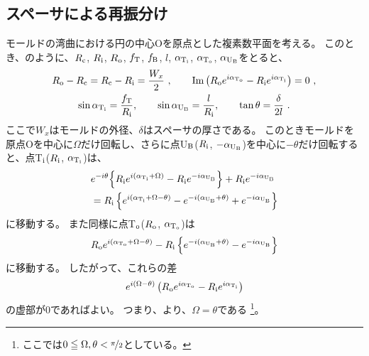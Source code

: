 \subsection{スペーサによる再振分け}
モールドの湾曲における円の中心Oを原点とした複素数平面を考える。
このとき、のように、$R_\text c$, $R_\text i$, $R_\text o$, $f_\text T$, $f_\text B$, $l$, $\alpha_{\text T_\text i}$, $\alpha_{\text T_\text o}$, $\alpha_{\text U_\text B}$をとると、
\begin{subequations}
\label{eq:constraintUpoint}
\begin{gather}
  \label{eq:constraintUpoint1}
  R_\text o - R_\text c = R_\text c - R_\text i = \frac{W_x}2~, \qquad
  \text{Im}\left(R_\text oe^{i\alpha_{\text T_\text o}} - R_\text ie^{i\alpha_{\text T_\text i}}\right) = 0~,\\
  \label{eq:constraintUpoint2}
  \sin\alpha_{\text T_\text i} = \frac{f_\text T}{R_\text i}, \qquad
  \sin\alpha_{\text U_\text B} = \frac l{R_\text i}, \qquad
  \tan\theta = \frac\delta{2l}~.
\end{gather}
\end{subequations}
ここで$W_x$はモールドの外径、$\delta$はスペーサの厚さである。
このときモールドを原点Oを中心に$\Omega$だけ回転し、さらに点U$_\text B$($R_\text i$, $-\alpha_{\text U_\text B}$)を中心に$-\theta$だけ回転すると、点T$_\text i$($R_\text i$, $\alpha_{\text T_\text i}$)は、
\begin{align}
  \notag
  & e^{-i\theta}\!\left\{R_\text ie^{i(\alpha_{\text T_\text i} + \Omega)} - R_\text ie^{-i\alpha_{\text U_\text B}}\right\}
    +R_\text ie^{-i\alpha_{\text U_\text B}}\\
  &= R_\text i
     \left\{
       e^{i(\alpha_{\text T_\text i} + \Omega - \theta)} - e^{-i(\alpha_{\text U_\text B} + \theta)} + e^{-i\alpha_{\text U_\text B}}
     \right\}
  \label{eq:afterftUpoint}
\end{align}
に移動する。
また同様に点T$_\text o$($R_\text o$, $\alpha_{\text T_\text o}$)は
\begin{equation}
  \notag
  R_\text oe^{i(\alpha_{\text T_\text o} + \Omega - \theta)} - R_\text i\left\{e^{-i(\alpha_{\text U_\text B} + \theta)} - e^{-i\alpha_{\text U_\text B}}\right\}
\end{equation}
に移動する。
したがって、これらの差
\begin{equation}
  \notag
  e^{i(\Omega - \theta)}\left(R_\text oe^{i\alpha_{\text T_\text o}} - R_\text ie^{i\alpha_{\text T_\text i}}\right)
\end{equation}
の虚部が$0$であればよい。
つまり、より、$\Omega = \theta$である
\footnote{ここでは$0 \leqq \Omega, \theta < \nicefrac \pi2$としている。}。

